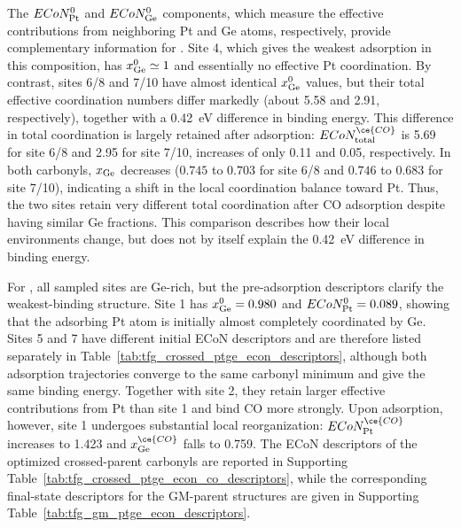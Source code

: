 The $ECoN_{\rm Pt}^{0}$ and $ECoN_{\rm Ge}^{0}$ components, which measure the
effective contributions from neighboring Pt and Ge atoms, respectively,
provide complementary information for .
Site 4, which gives the weakest adsorption in this composition, has
$x_{\rm Ge}^{0}\simeq1$ and essentially no effective Pt coordination. By
contrast, sites 6/8 and 7/10 have almost identical $x_{\rm Ge}^{0}$ values,
but their total effective coordination numbers differ markedly (about 5.58
and 2.91, respectively), together with a 0.42~eV difference in binding energy.
This difference in total coordination is largely retained after adsorption:
$ECoN_{\rm total}^{\ce{CO}}$ is 5.69 for site 6/8 and 2.95 for site 7/10,
increases of only 0.11 and 0.05, respectively. In both carbonyls,
$x_{\rm Ge}$ decreases ($0.745$ to $0.703$ for site 6/8 and $0.746$ to
$0.683$ for site 7/10), indicating a shift in the local coordination balance
toward Pt. Thus, the two sites retain very different total coordination after
CO adsorption despite having similar Ge fractions. This comparison describes
how their local environments change, but does not by itself explain the
0.42~eV difference in binding energy.

For , all sampled sites are Ge-rich, but the pre-adsorption
descriptors clarify the weakest-binding structure. Site 1 has
$x_{\rm Ge}^{0}=0.980$ and $ECoN_{\rm Pt}^{0}=0.089$, showing that the
adsorbing Pt atom is initially almost completely coordinated by Ge. Sites 5
and 7 have different initial ECoN descriptors and are therefore listed
separately in Table~\ref{tab:tfg_crossed_ptge_econ_descriptors}, although both
adsorption trajectories converge to the same carbonyl minimum and give the
same binding energy. Together with site 2, they retain larger effective
contributions from Pt than site 1 and bind CO more strongly. Upon adsorption,
however, site 1 undergoes substantial local
reorganization: $ECoN_{\rm Pt}^{\ce{CO}}$ increases to 1.423 and
$x_{\rm Ge}^{\ce{CO}}$ falls to 0.759. The ECoN descriptors of the optimized
crossed-parent carbonyls are reported in Supporting
Table~\ref{tab:tfg_crossed_ptge_econ_co_descriptors}, while the corresponding
final-state descriptors for the GM-parent structures are given in Supporting
Table~\ref{tab:tfg_gm_ptge_econ_descriptors}.

